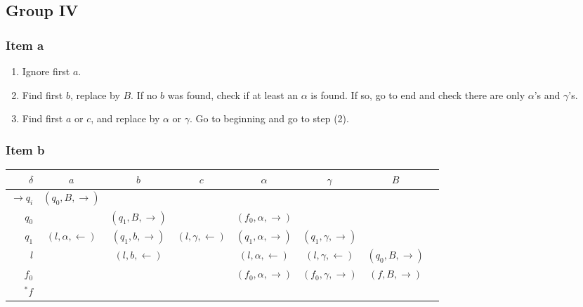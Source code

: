 \documentclass[docid=2017/18]{tcom_exam}
\begin{document}
{\subsection{Group IV}
\subsubsection{Item a}
\begin{enumerate}
	\item Ignore first $a$.
	\item Find first $b$, replace by $B$. If no $b$ was found, check if at least an $\alpha$ is found. If so, go to end and check there are only $\alpha$'s and $\gamma$'s. 
	\item Find first $a$ or $c$, and replace by $\alpha$ or $\gamma$. Go to beginning and go to step (2).
\end{enumerate}
\subsubsection{Item b}
\begin{center}
	\begin{tabular}{r | c c c c c c c }
		$\delta$          & $a$                     & $b$                   & $c$                     & $\alpha$                   & $\gamma$                   & $B$ \\ \hline
		$\rightarrow q_i$ & $(q_0,B,\rightarrow)$   &                       &                         &                            &                            &     \\
		$            q_0$ &                         & $(q_1,B,\rightarrow)$ &                         & $(f_0,\alpha,\rightarrow)$ &                            &     \\
		$            q_1$ & $(l,\alpha,\leftarrow)$ & $(q_1,b,\rightarrow)$ & $(l,\gamma,\leftarrow)$ & $(q_1,\alpha,\rightarrow)$ & $(q_1,\gamma,\rightarrow)$ &                     \\
		$            l  $ &                         & $(l  ,b,\leftarrow )$ &                         & $(l  ,\alpha,\leftarrow )$ & $(l  ,\gamma,\leftarrow )$ & $(q_0,B,\rightarrow)$ \\
		$            f_0$ &                         &                       &                         & $(f_0,\alpha,\rightarrow)$ & $(f_0,\gamma,\rightarrow)$ & $(f,B,\rightarrow)$ \\
		$         ^* f  $ &                         &                       &                         &                            &                            & 
	\end{tabular}
\end{center}
}
\end{document}
